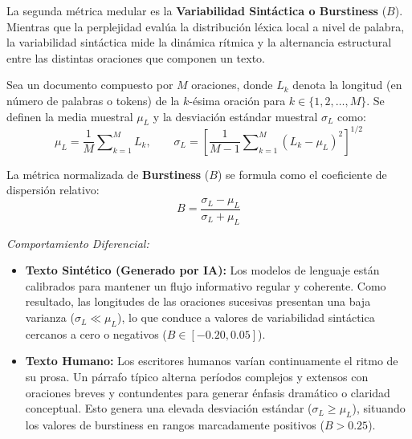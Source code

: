 La segunda métrica medular es la \textbf{Variabilidad Sintáctica o Burstiness} ($B$). Mientras que la perplejidad evalúa la distribución léxica local a nivel de palabra, la variabilidad sintáctica mide la dinámica rítmica y la alternancia estructural entre las distintas oraciones que componen un texto.

Sea un documento compuesto por $M$ oraciones, donde $L_k$ denota la longitud (en número de palabras o tokens) de la $k$-ésima oración para $k \in \{1, 2, \dots, M\}$. Se definen la media muestral $\mu_L$ y la desviación estándar muestral $\sigma_L$ como:
\begin{equation}
\mu_L = \frac{1}{M} \sum\nolimits_{k=1}^M L_k, \qquad \sigma_L = \left[ \frac{1}{M-1} \sum\nolimits_{k=1}^M (L_k - \mu_L)^2 \right]^{1/2}
\end{equation}

La métrica normalizada de \textbf{Burstiness} ($B$) se formula como el coeficiente de dispersión relativo:
\begin{equation}
B = \frac{\sigma_L - \mu_L}{\sigma_L + \mu_L}
\end{equation}


\textit{Comportamiento Diferencial:}
\begin{itemize}
    \item \textbf{Texto Sintético (Generado por IA):} Los modelos de lenguaje están calibrados para mantener un flujo informativo regular y coherente. Como resultado, las longitudes de las oraciones sucesivas presentan una baja varianza ($\sigma_L \ll \mu_L$), lo que conduce a valores de variabilidad sintáctica cercanos a cero o negativos ($B \in [-0.20, 0.05]$).
    \item \textbf{Texto Humano:} Los escritores humanos varían continuamente el ritmo de su prosa. Un párrafo típico alterna períodos complejos y extensos con oraciones breves y contundentes para generar énfasis dramático o claridad conceptual. Esto genera una elevada desviación estándar ($\sigma_L \ge \mu_L$), situando los valores de burstiness en rangos marcadamente positivos ($B > 0.25$).
\end{itemize}

